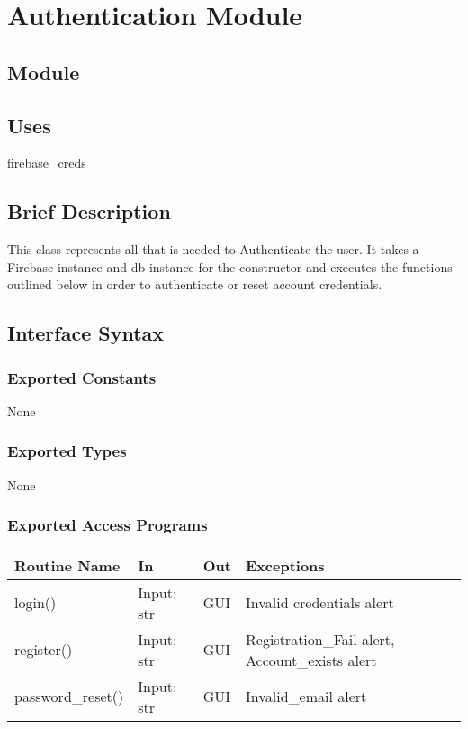 \documentclass[12pt, titlepage]{article}
\begin{document}
\section* {Authentication Module}

\subsection*{Module}

\subsection* {Uses}
firebase\_creds


\subsection* {Brief Description}
This class represents all that is needed to Authenticate the user.
It takes a Firebase instance and db instance for the constructor and executes the functions outlined below in order to authenticate or reset account credentials.


\subsection* {Interface Syntax}
\subsubsection* {Exported Constants}
None

\subsubsection* {Exported Types}
None

\subsubsection* {Exported Access Programs}
\begin{table}[!htb]
    \centering
    \begin{tabular}{|p{3.5cm}|p{3cm}|p{3.5cm}|p{3cm}|}
        \hline
        \textbf{Routine Name} & \textbf{In} & \textbf{Out} & \textbf{Exceptions} \\
        \hline
         login() & Input: str & GUI & Invalid credentials alert\\
        \hline
         register() & Input: str  & GUI & Registration\_Fail alert, Account\_exists alert\\
        \hline
         password\_reset() & Input: str  & GUI & Invalid\_email alert\\
        \hline
    \end{tabular}
\end{table}
\end{document}
